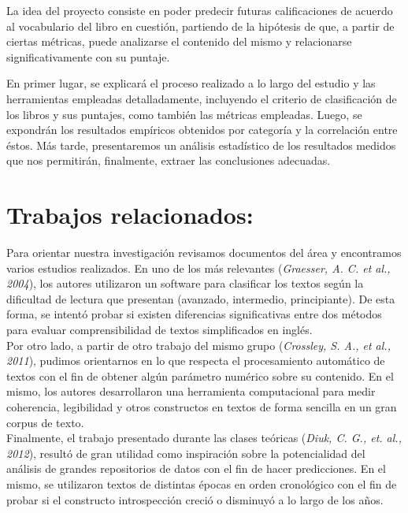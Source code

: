\documentclass[12pt,journal,compsoc]{IEEEtran}
\begin{document}
La idea del proyecto consiste en poder predecir futuras calificaciones de acuerdo al vocabulario del libro en cuestión, partiendo de la hipótesis de que, a partir de ciertas métricas, puede analizarse el contenido del mismo y relacionarse significativamente con su puntaje.

En primer lugar, se explicará el proceso realizado a lo largo del estudio y las herramientas empleadas detalladamente, incluyendo el criterio de clasificación de los libros y sus puntajes, como también las métricas empleadas. Luego, se expondrán los resultados empíricos obtenidos por categoría y la correlación entre éstos. Más tarde, presentaremos un análisis estadístico de los resultados medidos que nos permitirán, finalmente, extraer las conclusiones adecuadas.

\section{Trabajos relacionados:}

Para orientar nuestra investigación revisamos documentos del área y encontramos varios estudios realizados. En uno de los más relevantes (\textit{Graesser, A. C. et al., 2004}), los autores utilizaron un software para clasificar los textos según la dificultad de lectura que presentan (avanzado, intermedio, principiante). De esta forma, se intentó probar si existen diferencias significativas entre dos métodos para evaluar comprensibilidad de textos simplificados en inglés.\\
Por otro lado, a partir de otro trabajo del mismo grupo (\textit{Crossley, S. A., et al., 2011}), pudimos orientarnos en lo que respecta el procesamiento automático de textos con el fin de obtener algún parámetro numérico sobre su contenido. En el mismo, los autores desarrollaron una herramienta computacional para medir coherencia, legibilidad y otros constructos en textos de forma sencilla en un gran corpus de texto.\\
Finalmente, el trabajo presentado durante las clases teóricas (\textit{Diuk, C. G., et. al., 2012}), resultó de gran utilidad como inspiración sobre la potencialidad del análisis de grandes repositorios de datos con el fin de hacer predicciones. En el mismo, se utilizaron  textos de distintas épocas en orden cronológico con el fin de probar si el constructo introspección creció o disminuyó a lo largo de los años.
\end{document}
